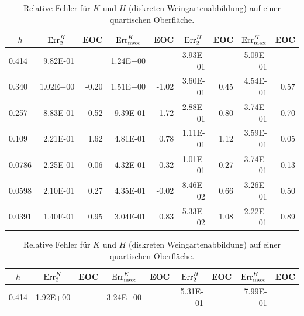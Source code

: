    \begin{table}[htbp]
      \centering
      \begin{tabular}{|l|r|r|r|r|r|r|r|r|}
      \hline
      \multicolumn{1}{|c|}{\( h \)} & \multicolumn{1}{c|}{\( \text{Err}_{2}^{K} \)} & \multicolumn{1}{c|}{EOC} & 
           \multicolumn{1}{c|}{\( \text{Err}_{\max}^{K} \)} & \multicolumn{1}{c|}{EOC} & \multicolumn{1}{c|}{\( \text{Err}_{2}^{H} \)} &
           \multicolumn{1}{c|}{EOC} & \multicolumn{1}{c|}{\( \text{Err}_{\max}^{H} \)} & \multicolumn{1}{c|}{EOC} \\ \hline
           0.414 & 9.82E-01 & \multicolumn{1}{l|}{} & 1.24E+00 & \multicolumn{1}{l|}{} & 3.93E-01 & \multicolumn{1}{l|}{} & 5.09E-01 & \multicolumn{1}{l|}{} \\ \hline
            0.340 & 1.02E+00 & -0.20 & 1.51E+00 & -1.02 & 3.60E-01 & 0.45 & 4.54E-01 & 0.57 \\ \hline
            0.257 & 8.83E-01 & 0.52 & 9.39E-01 & 1.72 & 2.88E-01 & 0.80 & 3.74E-01 & 0.70 \\ \hline
            0.109 & 2.21E-01 & 1.62 & 4.81E-01 & 0.78 & 1.11E-01 & 1.12 & 3.59E-01 & 0.05 \\ \hline
            0.0786 & 2.25E-01 & -0.06 & 4.32E-01 & 0.32 & 1.01E-01 & 0.27 & 3.74E-01 & -0.13 \\ \hline
            0.0598 & 2.10E-01 & 0.27 & 4.35E-01 & -0.02 & 8.46E-02 & 0.66 & 3.26E-01 & 0.50 \\ \hline
            0.0391 & 1.40E-01 & 0.95 & 3.04E-01 & 0.83 & 5.33E-02 & 1.08 & 2.22E-01 & 0.89 \\ \hline
      \end{tabular}
      \caption[Weingarten auf einer quartischen Oberfläche]{Relative Fehler für \( K \) und \( H \) (diskreten Weingartenabbildung) auf einer quartischen Oberfläche.}
      \label{tabHeineBWeingarten}
      \vspace{10pt}
      \begin{tabular}{|l|r|r|r|r|r|r|r|r|}
      \hline
      \multicolumn{1}{|c|}{\( h \)} & \multicolumn{1}{c|}{\( \text{Err}_{2}^{K} \)} & \multicolumn{1}{c|}{EOC} & 
           \multicolumn{1}{c|}{\( \text{Err}_{\max}^{K} \)} & \multicolumn{1}{c|}{EOC} & \multicolumn{1}{c|}{\( \text{Err}_{2}^{H} \)} &
           \multicolumn{1}{c|}{EOC} & \multicolumn{1}{c|}{\( \text{Err}_{\max}^{H} \)} & \multicolumn{1}{c|}{EOC} \\ \hline
           0.414 & 1.92E+00 & \multicolumn{1}{l|}{} & 3.24E+00 & \multicolumn{1}{l|}{} & 5.31E-01 & \multicolumn{1}{l|}{} & 7.99E-01 & \multicolumn{1}{l|}{} \\ \hline

\end{tabular}
\end{table}
